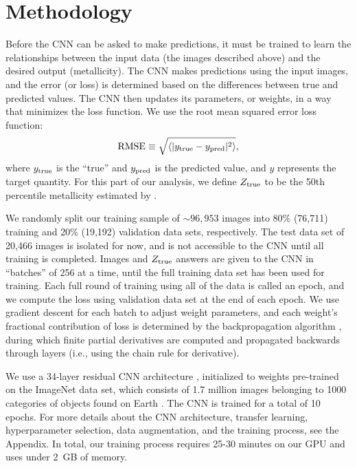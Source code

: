 \documentclass[fleqn,usenatbib]{mnras}
\begin{document}
\section{Methodology}\label{sec:training}
Before the CNN can be asked to make predictions, it must be trained to learn the relationships between the input data (the images described above) and the desired output (metallicity). The CNN makes predictions using the input images, and the error (or loss) is determined based on the differences between true and predicted values. The CNN then updates its parameters, or weights, in a way that minimizes the loss function. We use the root mean squared error loss function:
\begin{equation}
\mathrm{RMSE} \equiv \sqrt{\langle |y_{\rm true} - y_{\rm pred}|^2\rangle},
\end{equation}
where $y_{\rm true}$ is the ``true'' and $y_{\rm pred}$ is the predicted value, and $y$ represents the target quantity. For this part of our analysis, we define $Z_{\rm true}$ to be the 50th percentile metallicity estimated by \cite{Tremonti2004}.

We randomly split our training sample of $\sim 96,953$ images into 80\% (76,711) training and 20\% (19,192) validation data sets, respectively. The test data set of 20,466 images is isolated for now, and is not accessible to the CNN until all training is completed. Images and $Z_{\rm true}$ answers are given to the CNN in ``batches'' of 256 at a time, until the full training data set has been used for training. Each full round of training using all of the data is called an epoch, and we compute the loss using validation data set at the end of each epoch.
We use gradient descent for each batch to adjust weight parameters, and each weight's fractional contribution of loss is determined by the backpropagation algorithm \citep{LeCun1989}, during which finite partial derivatives are computed and propagated backwards through layers (i.e., using the chain rule for derivative). 

We use a 34-layer residual CNN architecture \citep{He2015}, initialized to weights pre-trained on the ImageNet data set, which consists of 1.7 million images belonging to 1000 categories of objects found on Earth \citep[e.g., cats, horses, cars, or books;][]{ImageNet}.
The CNN is trained for a total of 10 epochs.
For more details about the CNN architecture, transfer learning, hyperparameter selection, data augmentation, and the training process, see the Appendix.
In total, our training process requires 25-30 minutes on our GPU and uses under 2~GB of memory.
\end{document}

